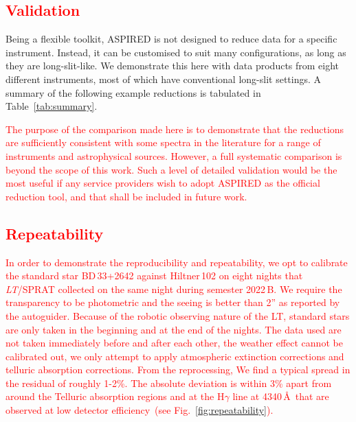 \documentclass[linenumbers, twocolumn]{aastex631}
\begin{document}
\textcolor{red}{\section{Validation}}
Being a flexible toolkit, \textsc{ASPIRED} is not designed to reduce data for a
specific instrument. Instead, it can be customised to suit many configurations,
as long as they are long-slit-like. We demonstrate this here with data products
from eight different instruments, most of which have conventional long-slit
settings. A summary of the following example reductions is tabulated in
Table~\ref{tab:summary}.

\textcolor{red}{The purpose of the comparison made here is to demonstrate that
the reductions are sufficiently consistent with some spectra in the literature
for a range of instruments and astrophysical sources. However, a full
systematic comparison is beyond the scope of this work. Such a level of
detailed validation would be the most useful if any service providers wish to
adopt \textsc{ASPIRED} as the official reduction tool, and that shall be
included in future work.}

\textcolor{red}{\subsection{Repeatability}}
\textcolor{red}{In order to demonstrate the reproducibility and repeatability,
we opt to calibrate the standard star BD\,33+2642 against Hiltner\,102 on
eight nights that \textit{LT}/SPRAT collected on the same night during
semester 2022\,B. We require the transparency to be photometric and the seeing
is better than 2'' as reported by the autoguider. Because of the robotic
observing nature of the LT, standard stars are only taken in the beginning
and at the end of the nights. The data used are not taken immediately
before and after each other, the weather effect cannot be calibrated out,
we only attempt to apply atmospheric extinction corrections and telluric
absorption corrections. From the reprocessing, We find a typical spread in
the residual of roughly 1-2\%. The absolute deviation is within 3\% apart from
around the Telluric absorption regions and at the H$\gamma$ line at 4340\,\AA\
that are observed at low detector efficiency~(see Fig.~\ref{fig:repeatability}).}
\end{document}
